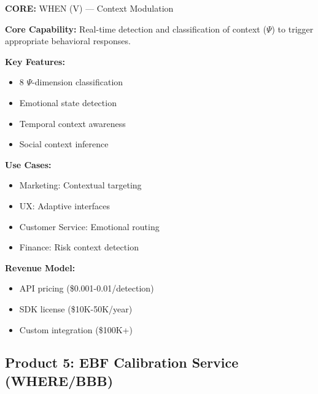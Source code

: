 \begin{tcolorbox}[colback=green!5!white, colframe=green!75!black,
    title=Product: Context Detection Engine]

\textbf{CORE:} WHEN (V) --- Context Modulation

\textbf{Core Capability:}
Real-time detection and classification of context ($\Psi$) to trigger appropriate behavioral responses.

\textbf{Key Features:}
\begin{itemize}[nosep]
\item 8 $\Psi$-dimension classification
\item Emotional state detection
\item Temporal context awareness
\item Social context inference
\end{itemize}

\textbf{Use Cases:}
\begin{itemize}[nosep]
\item Marketing: Contextual targeting
\item UX: Adaptive interfaces
\item Customer Service: Emotional routing
\item Finance: Risk context detection
\end{itemize}

\textbf{Revenue Model:}
\begin{itemize}[nosep]
\item API pricing (\$0.001-0.01/detection)
\item SDK license (\$10K-50K/year)
\item Custom integration (\$100K+)
\end{itemize}

\end{tcolorbox}


\subsection{Product 5: EBF Calibration Service (WHERE/BBB)}

